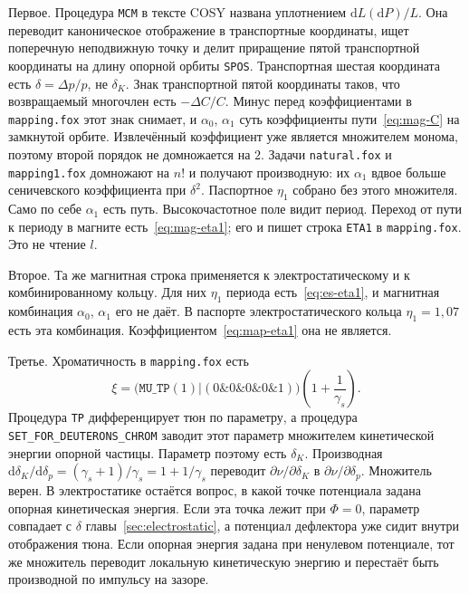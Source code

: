 Первое. Процедура \texttt{MCM} в тексте COSY названа уплотнением $\mathrm{d}L(\mathrm{d}P)/L$. Она переводит каноническое отображение в транспортные координаты, ищет поперечную неподвижную точку и делит приращение пятой транспортной координаты на длину опорной орбиты \texttt{SPOS}. Транспортная шестая координата есть $\delta=\Delta p/p$, не $\delta_K$. Знак транспортной пятой координаты таков, что возвращаемый многочлен есть $-\Delta C/C$. Минус перед коэффициентами в \texttt{mapping.fox} этот знак снимает, и $\alpha_0$, $\alpha_1$ суть коэффициенты пути~\eqref{eq:mag-C} на замкнутой орбите. Извлечённый коэффициент уже является множителем монома, поэтому второй порядок не домножается на $2$. Задачи \texttt{natural.fox} и \texttt{mapping1.fox} домножают на $n!$ и получают производную: их $\alpha_1$ вдвое больше сеничевского коэффициента при $\delta^2$. Паспортное $\eta_1$ собрано без этого множителя. Само по себе $\alpha_1$ есть путь. Высокочастотное поле видит период. Переход от пути к периоду в магните есть~\eqref{eq:mag-eta1}; его и пишет строка \texttt{ETA1} в \texttt{mapping.fox}. Это не чтение $l$.

Второе. Та же магнитная строка применяется к электростатическому и к комбинированному кольцу. Для них $\eta_1$ периода есть~\eqref{eq:es-eta1}, и магнитная комбинация $\alpha_0$, $\alpha_1$ его не даёт. В паспорте электростатического кольца $\eta_1=1{,}07$ есть эта комбинация. Коэффициентом~\eqref{eq:map-eta1} она не является.

Третье. Хроматичность в \texttt{mapping.fox} есть
\begin{equation}
\label{eq:map-chrom}
\xi
=
\bigl(\texttt{MU\_TP}(1)|(0\&0\&0\&0\&1)\bigr)
\left(1+\frac{1}{\gamma_s}\right).
\end{equation}
Процедура \texttt{TP} дифференцирует тюн по параметру, а процедура \texttt{SET\_FOR\_DEUTERONS\_CHROM} заводит этот параметр множителем кинетической энергии опорной частицы. Параметр поэтому есть $\delta_K$. Производная $\mathrm{d}\delta_K/\mathrm{d}\delta_p=(\gamma_s+1)/\gamma_s=1+1/\gamma_s$ переводит $\partial\nu/\partial\delta_K$ в $\partial\nu/\partial\delta_p$. Множитель верен. В электростатике остаётся вопрос, в какой точке потенциала задана опорная кинетическая энергия. Если эта точка лежит при $\Phi=0$, параметр совпадает с $\delta$ главы~\ref{sec:electrostatic}, а потенциал дефлектора уже сидит внутри отображения тюна. Если опорная энергия задана при ненулевом потенциале, тот же множитель переводит локальную кинетическую энергию и перестаёт быть производной по импульсу на зазоре.

